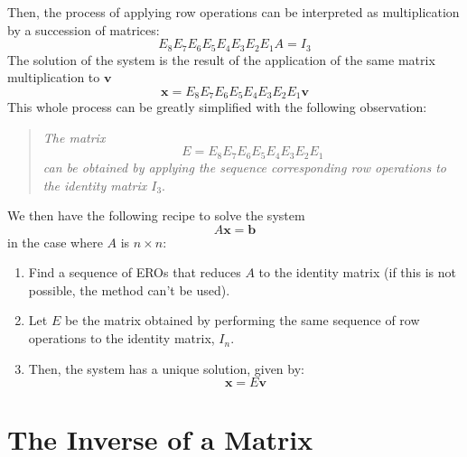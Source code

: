 \documentclass[12pt]{article}
\begin{document}
Then, the process of applying row operations can be interpreted as multiplication by a succession of matrices:
\[
E_8E_7E_6E_5E_4E_3E_2E_1A=I_3
\]
The solution of the system is the result of the application of the same matrix multiplication to $\textbf{v}$
\[
\textbf{x}=E_8E_7E_6E_5E_4E_3E_2E_1\textbf{v}
\]
This whole process can be greatly simplified with the following observation:

\begin{quote}
\emph{The matrix
\[
E=E_8E_7E_6E_5E_4E_3E_2E_1
\]
can be obtained by applying the sequence corresponding row operations to the identity matrix $I_3$}.
\end{quote}

We then have the following recipe to solve the system
\[
A\mathbf{x}=\mathbf{b}
\]
in the case where $A$ is $n\times n$:
\begin{enumerate}
\item Find a sequence of EROs that reduces $A$ to the identity matrix (if this is not possible, the method can't be used).
\item Let $E$ be the matrix obtained by performing the same sequence of row operations to the identity matrix, $I_n$.
\item Then, the system has a unique solution, given by:
\[
\mathbf{x}=E\mathbf{v}
\]
\end{enumerate}

\section{The Inverse of a Matrix}
\end{document}
